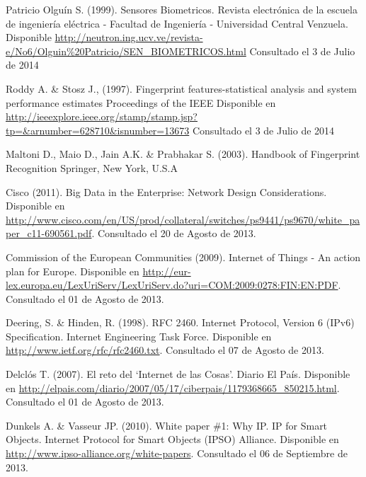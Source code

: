 \begin{spacing}{1.0}
\begin{thebibliography}{99}
Patricio Olguín S. (1999).
\newblock Sensores Biometricos.
\newblock Revista electrónica de la escuela de ingeniería eléctrica - Facultad de Ingeniería - Universidad Central Venzuela.
\newblock Disponible \url{http://neutron.ing.ucv.ve/revista-e/No6/Olguin\%20Patricio/SEN_BIOMETRICOS.html}
\newblock Consultado el 3 de Julio de 2014


Roddy A. \& Stosz J., (1997).
\newblock Fingerprint features-statistical analysis and system performance estimates
\newblock Proceedings of the IEEE
\newblock Disponible en \url{http://ieeexplore.ieee.org/stamp/stamp.jsp?tp=&arnumber=628710&isnumber=13673}
\newblock Consultado el 3 de Julio de 2014

Maltoni D., Maio D., Jain A.K. \& Prabhakar S. (2003).
\newblock Handbook of Fingerprint Recognition
\newblock Springer, New York, U.S.A




Cisco (2011).
\newblock Big Data in the Enterprise: Network Design Considerations.
\newblock Disponible en \url{http://www.cisco.com/en/US/prod/collateral/switches/ps9441/ps9670/white_paper_c11-690561.pdf}.
\newblock Consultado el 20 de Agosto de 2013.

Commission of the European Communities (2009).
\newblock Internet of Things - An action plan for Europe.
\newblock Disponible en \url{http://eur-lex.europa.eu/LexUriServ/LexUriServ.do?uri=COM:2009:0278:FIN:EN:PDF}.
\newblock Consultado el 01 de Agosto de 2013.

Deering, S. \& Hinden, R. (1998).
\newblock RFC 2460. Internet Protocol, Version 6 (IPv6) Specification. Internet Engineering Task Force.
\newblock Disponible en \url{http://www.ietf.org/rfc/rfc2460.txt}.
\newblock Consultado el 07 de Agosto de 2013.

Delclós T. (2007).
\newblock El reto del `Internet de las Cosas'. Diario El País.
\newblock Disponible en \url{http://elpais.com/diario/2007/05/17/ciberpais/1179368665_850215.html}.
\newblock Consultado el 01 de Agosto de 2013.

Dunkels A. \& Vasseur JP. (2010).
\newblock White paper \#1: Why IP. IP for Smart Objects.
\newblock Internet Protocol for Smart Objects (IPSO) Alliance.
\newblock Disponible en \url{http://www.ipso-alliance.org/white-papers}.
\newblock Consultado el 06 de Septiembre de 2013.


\end{thebibliography}
\end{spacing}
